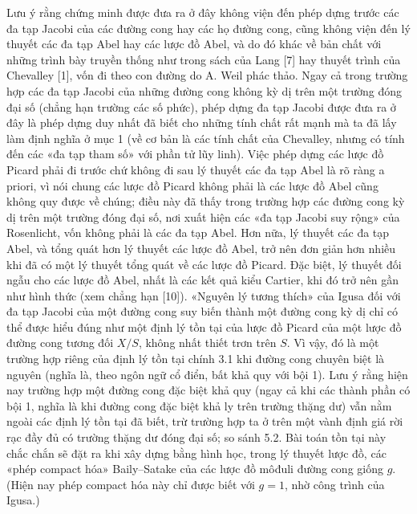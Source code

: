 Lưu ý rằng chứng minh được đưa ra ở đây không viện đến
phép dựng trước các đa tạp Jacobi của các đường cong hay các họ đường cong,
cũng không viện đến lý thuyết các đa tạp Abel hay các lược đồ Abel, và do đó
khác về bản chất với những trình bày truyền thống như trong sách của Lang [7]
hay thuyết trình của Chevalley [1], vốn đi theo con đường do A. Weil phác thảo.
Ngay cả trong trường hợp các đa tạp Jacobi của những đường cong không kỳ dị
trên một trường đóng đại số (chẳng hạn trường các số phức), phép dựng đa tạp
Jacobi được đưa ra ở đây là phép dựng duy nhất đã biết cho những tính chất rất
mạnh mà ta đã lấy làm định nghĩa ở mục 1 (về cơ bản là các tính chất của
Chevalley, nhưng có tính đến các «đa tạp tham số» với phần tử lũy linh). Việc
phép dựng các lược đồ Picard phải đi trước chứ không đi sau lý thuyết các đa
tạp Abel là rõ ràng a priori, vì nói chung các lược đồ Picard không phải là các
lược đồ Abel cũng không quy được về chúng; điều này đã thấy trong trường hợp
các đường cong kỳ dị trên một trường đóng đại số, nơi xuất hiện các «đa tạp
Jacobi suy rộng» của Rosenlicht, vốn không phải là các đa tạp Abel. Hơn nữa, lý
thuyết các đa tạp Abel, và tổng quát hơn lý thuyết các lược đồ Abel, trở nên
đơn giản hơn nhiều khi đã có một lý thuyết tổng quát về các lược đồ Picard. Đặc
biệt, lý thuyết đối ngẫu cho các lược đồ Abel, nhất là các kết quả kiểu Cartier,
khi đó trở nên gần như hình thức (xem chẳng hạn [10]).
 «Nguyên lý tương thích» của Igusa đối với đa tạp
Jacobi của một đường cong suy biến thành một đường cong kỳ dị chỉ có thể được
hiểu đúng như một định lý tồn tại của lược đồ Picard của một lược đồ đường cong
tương đối $X/S$, không nhất thiết trơn trên $S$. Vì vậy, đó là một trường hợp
riêng của định lý tồn tại chính 3.1 khi đường cong chuyên biệt là nguyên (nghĩa
là, theo ngôn ngữ cổ điển, bất khả quy với bội 1). Lưu ý rằng hiện nay trường
hợp một đường cong đặc biệt khả quy (ngay cả khi các thành phần có bội 1, nghĩa
là khi đường cong đặc biệt khả ly trên trường thặng dư) vẫn nằm ngoài các định
lý tồn tại đã biết, trừ trường hợp ta ở trên một vành định giá rời rạc đầy đủ
có trường thặng dư đóng đại số; so sánh 5.2. Bài toán tồn tại này chắc chắn sẽ
đặt ra khi xây dựng bằng hình học, trong lý thuyết lược đồ, các «phép compact
hóa» Baily--Satake của các lược đồ môđuli đường cong giống $g$. (Hiện nay phép
compact hóa này chỉ được biết với $g=1$, nhờ công trình của Igusa.)


